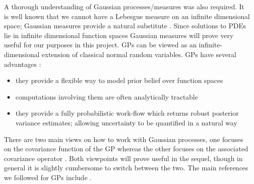 A thorough understanding of Gaussian processes/measures was also required. It is well known that we cannot have a Lebesgue measure on an infinite dimensional space; Gaussian measures provide a natural substitute \textcolor{blue}{\cite{da2006introduction}}. Since solutions to PDEs lie in infinite dimensional function spaces Gaussian measures will prove very useful for our purposes in this project. GPs can be viewed as an infinite-dimensional extension of classical normal random variables. GPs have several advantages \textcolor{blue}{\cite{raissi2017machine}}:
\begin{itemize}
    \item they provide a flexible way to model prior belief over function spaces
    \item computations involving them are often analytically tractable
    \item they provide a fully probabilistic work-flow which returns robust posterior variance estimates; allowing uncertainty to be quantified in a natural way
\end{itemize}
There are two main views on how to work with Gaussian processes, one focuses on the covariance function of the GP \textcolor{blue}{\cite{Rasmussen06gaussianprocesses}} whereas the other focuses on the associated covariance operator \textcolor{blue}{\cite{da2006introduction,lifshits2012lectures,lunardi2015infinite}}. Both viewpoints will prove useful in the sequel, though in general it is slightly cumbersome to switch between the two. The main references we followed for GPs include \textcolor{blue}{\cite{da2006introduction,Rasmussen06gaussianprocesses,lifshits2012lectures,lunardi2015infinite}}.

